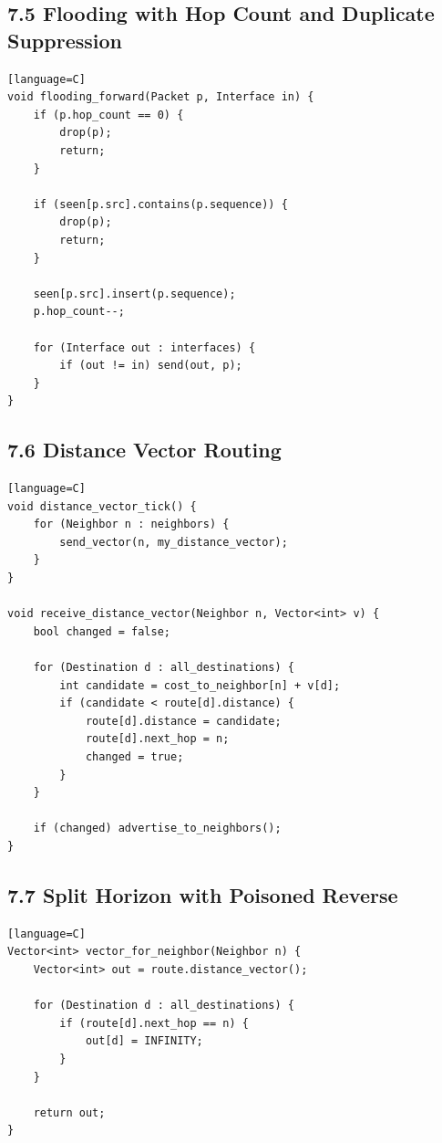 \documentclass[11pt]{article}
\begin{document}
\subsection{7.5 Flooding with Hop Count and Duplicate
Suppression}\label{flooding-with-hop-count-and-duplicate-suppression}

\begin{verbatim}[language=C]
void flooding_forward(Packet p, Interface in) {
    if (p.hop_count == 0) {
        drop(p);
        return;
    }

    if (seen[p.src].contains(p.sequence)) {
        drop(p);
        return;
    }

    seen[p.src].insert(p.sequence);
    p.hop_count--;

    for (Interface out : interfaces) {
        if (out != in) send(out, p);
    }
}
\end{verbatim}

\subsection{7.6 Distance Vector Routing}\label{distance-vector-routing}

\begin{verbatim}[language=C]
void distance_vector_tick() {
    for (Neighbor n : neighbors) {
        send_vector(n, my_distance_vector);
    }
}

void receive_distance_vector(Neighbor n, Vector<int> v) {
    bool changed = false;

    for (Destination d : all_destinations) {
        int candidate = cost_to_neighbor[n] + v[d];
        if (candidate < route[d].distance) {
            route[d].distance = candidate;
            route[d].next_hop = n;
            changed = true;
        }
    }

    if (changed) advertise_to_neighbors();
}
\end{verbatim}

\subsection{7.7 Split Horizon with Poisoned
Reverse}\label{split-horizon-with-poisoned-reverse}

\begin{verbatim}[language=C]
Vector<int> vector_for_neighbor(Neighbor n) {
    Vector<int> out = route.distance_vector();

    for (Destination d : all_destinations) {
        if (route[d].next_hop == n) {
            out[d] = INFINITY;
        }
    }

    return out;
}
\end{verbatim}
\end{document}

